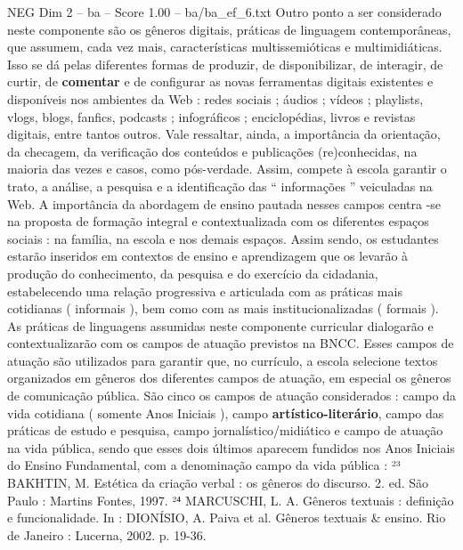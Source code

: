 \begin{textsample}{NEG Dim 2 – ba – Score 1.00 – ba/ba\_ef\_6.txt}
Outro ponto a ser considerado neste componente são os gêneros digitais, práticas de linguagem contemporâneas, que assumem, cada vez mais, características multissemióticas e multimidiáticas.
Isso se dá pelas diferentes formas de produzir, de disponibilizar, de interagir, de curtir, de \textbf{comentar} e de configurar as novas ferramentas digitais existentes e disponíveis nos ambientes da Web : redes sociais ; áudios ; vídeos ; playlists, vlogs, blogs, fanfics, podcasts ; infográficos ; enciclopédias, livros e revistas digitais, entre tantos outros.
Vale ressaltar, ainda, a importância da orientação, da checagem, da verificação dos conteúdos e publicações (re)conhecidas, na maioria das vezes e casos, como pós-verdade.
Assim, compete à escola garantir o trato, a análise, a pesquisa e a identificação das “ informações ” veiculadas na Web.
A importância da abordagem de ensino pautada nesses campos centra -se na proposta de formação integral e contextualizada com os diferentes espaços sociais : na família, na escola e nos demais espaços.
Assim sendo, os estudantes estarão inseridos em contextos de ensino e aprendizagem que os levarão à produção do conhecimento, da pesquisa e do exercício da cidadania, estabelecendo uma relação progressiva e articulada com as práticas mais cotidianas ( informais ), bem como com as mais institucionalizadas ( formais ).
As práticas de linguagens assumidas neste componente curricular dialogarão e contextualizarão com os campos de atuação previstos na BNCC.
Esses campos de atuação são utilizados para garantir que, no currículo, a escola selecione textos organizados em gêneros dos diferentes campos de atuação, em especial os gêneros de comunicação pública.
São cinco os campos de atuação considerados : campo da vida cotidiana ( somente Anos Iniciais ), campo \textbf{artístico-literário}, campo das práticas de estudo e pesquisa, campo jornalístico/midiático e campo de atuação na vida pública, sendo que esses dois últimos aparecem fundidos nos Anos Iniciais do Ensino Fundamental, com a denominação campo da vida pública : ²³ BAKHTIN, M.
Estética da criação verbal : os gêneros do discurso. 2. ed.
São Paulo : Martins Fontes, 1997. ²⁴ MARCUSCHI, L.
A.
Gêneros textuais : definição e funcionalidade.
In : DIONÍSIO, A.
Paiva et al.
Gêneros textuais \& ensino.
Rio de Janeiro : Lucerna, 2002. p. 19-36.

\end{textsample}
